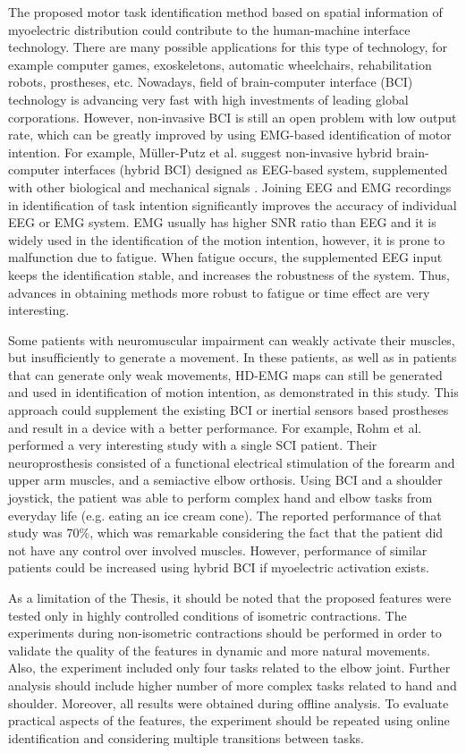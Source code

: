 The proposed motor task identification method based on spatial information of myoelectric distribution could contribute to the human-machine interface technology. There are many possible applications for this type of technology, for example computer games, exoskeletons, automatic wheelchairs, rehabilitation robots, prostheses, etc. Nowadays, field of brain-computer interface (BCI) technology is advancing very fast with high investments of leading global corporations. However, non-invasive BCI is still an open problem with low output rate, which can be greatly improved by using EMG-based identification of motor intention. For example, 
Müller-Putz et al. suggest non-invasive hybrid brain-computer interfaces (hybrid BCI) designed as EEG-based system, supplemented with other biological and mechanical signals  \citep{Muller-Putz2015}. Joining EEG and EMG recordings in identification of task intention significantly improves the accuracy of individual EEG or EMG system. EMG usually has higher SNR ratio than EEG and it is widely used in the identification of the motion intention, however, it is prone to malfunction due to fatigue. When fatigue occurs, the supplemented EEG input keeps the identification stable, and increases the robustness of the system. Thus, advances in obtaining methods more robust to fatigue or time effect are very interesting.

Some patients with neuromuscular impairment can weakly activate their muscles, but insufficiently to generate a movement. In these patients, as well as in patients that can generate only weak movements, HD-EMG maps can still be generated and used in identification of motion intention, as demonstrated in this study. This approach could supplement the existing BCI or inertial sensors based prostheses and result in a device with a better performance. For example, Rohm et al. \citep{Rohm2013} performed a very interesting study with a single SCI patient. Their neuroprosthesis consisted of a functional electrical stimulation of the forearm and upper arm muscles, and a semiactive elbow orthosis. Using BCI and a shoulder joystick, the patient was able to perform complex hand and elbow tasks from everyday life (e.g. eating an ice cream cone). The reported performance of that study was 70\%, which was remarkable considering the fact that the patient did not have any control over involved muscles. However, performance of similar patients could be increased using hybrid BCI if myoelectric activation exists.

As a limitation of the Thesis, it should be noted that the proposed features were tested only in highly controlled conditions of isometric contractions. The experiments during non-isometric contractions should be performed in order to validate the quality of the features in dynamic and more natural movements. Also, the experiment included only four tasks related to the elbow joint. Further analysis should include higher number of more complex tasks related to hand and shoulder. Moreover, all results were obtained during offline analysis. To evaluate practical aspects of the features, the experiment should be repeated using online identification and considering multiple transitions between tasks.



